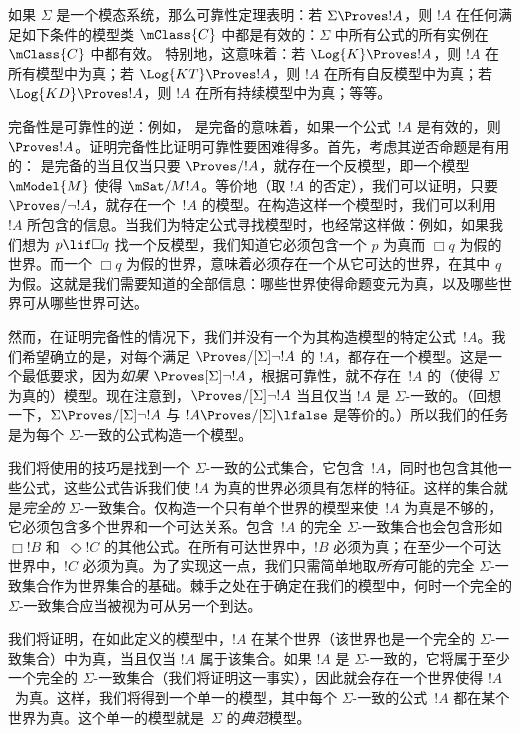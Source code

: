 \documentclass[../../../include/open-logic-section]{subfiles}
\begin{document}


如果 $\Sigma$ 是一个模态系统，那么可靠性定理表明：若 $\Sigma \Proves !A$，则 $!A$ 在任何满足如下条件的模型类 $\mClass{C}$ 中都是有效的：$\Sigma$ 中所有公式的所有实例在 $\mClass{C}$ 中都有效。
特别地，这意味着：若 $\Log{K} \Proves !A$，则 $!A$ 在所有模型中为真；若 $\Log{KT} \Proves !A$，则 $!A$ 在所有自反模型中为真；若 $\Log{KD} \Proves !A$，则 $!A$ 在所有持续模型中为真；等等。

完备性是可靠性的逆：例如， 是完备的意味着，如果一个公式~$!A$ 是有效的，则 $\Proves !A$。证明完备性比证明可靠性要困难得多。首先，考虑其逆否命题是有用的： 是完备的当且仅当只要 $\Proves/ !A$，就存在一个反模型，即一个模型~$\mModel{M}$ 使得 $\mSat/{M}{!A}$。等价地（取 $!A$ 的否定），我们可以证明，只要 $\Proves/ \lnot !A$，就存在一个~$!A$ 的模型。在构造这样一个模型时，我们可以利用 $!A$ 所包含的信息。当我们为特定公式寻找模型时，也经常这样做：例如，如果我们想为 $p \lif \Box q$ 找一个反模型，我们知道它必须包含一个 $p$ 为真而 $\Box q$ 为假的世界。而一个 $\Box q$ 为假的世界，意味着必须存在一个从它可达的世界，在其中 $q$ 为假。这就是我们需要知道的全部信息：哪些世界使得命题变元为真，以及哪些世界可从哪些世界可达。

然而，在证明完备性的情况下，我们并没有一个为其构造模型的特定公式~$!A$。我们希望确立的是，对每个满足 $\Proves/[\Sigma] \lnot !A$ 的 $!A$，都存在一个模型。这是一个最低要求，因为\emph{如果} $\Proves[\Sigma] \lnot !A$，根据可靠性，就不存在~$!A$ 的（使得 $\Sigma$ 为真的）模型。现在注意到，$\Proves/[\Sigma] \lnot !A$ 当且仅当 $!A$ 是 $\Sigma$-一致的。（回想一下，$\Sigma \Proves/[\Sigma] \lnot !A$ 与 $!A \Proves/[\Sigma] \lfalse$ 是等价的。）所以我们的任务是为每个 $\Sigma$-一致的公式构造一个模型。

我们将使用的技巧是找到一个 $\Sigma$-一致的公式集合，它包含~$!A$，同时也包含其他一些公式，这些公式告诉我们使 $!A$ 为真的世界必须具有怎样的特征。这样的集合就是\emph{完全的} $\Sigma$-一致集合。仅构造一个只有单个世界的模型来使~$!A$ 为真是不够的，它必须包含多个世界和一个可达关系。包含~$!A$ 的完全 $\Sigma$-一致集合也会包含形如 $\Box !B$ 和~$\Diamond !C$ 的其他公式。在所有可达世界中，$!B$ 必须为真；在至少一个可达世界中，$!C$ 必须为真。为了实现这一点，我们只需简单地取\emph{所有}可能的完全 $\Sigma$-一致集合作为世界集合的基础。棘手之处在于确定在我们的模型中，何时一个完全的 $\Sigma$-一致集合应当被视为可从另一个到达。

我们将证明，在如此定义的模型中，$!A$ 在某个世界（该世界也是一个完全的 $\Sigma$-一致集合）中为真，当且仅当 $!A$ 属于该集合。如果 $!A$ 是 $\Sigma$-一致的，它将属于至少一个完全的 $\Sigma$-一致集合（我们将证明这一事实），因此就会存在一个世界使得 $!A$~为真。这样，我们将得到一个单一的模型，其中每个 $\Sigma$-一致的公式~$!A$ 都在某个世界为真。这个单一的模型就是~$\Sigma$ 的\emph{典范}模型。
\end{document}
